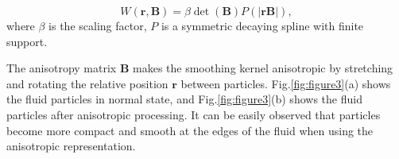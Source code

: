 \documentclass[times,twocolumn,final]{elsarticle}
\providecommand{\DIFaddtex}[1]{{\protect\color{blue}\uwave{#1}}} %
\providecommand{\DIFaddbegin}{} %
\providecommand{\DIFaddend}{} %
\providecommand{\DIFdelend}{} %
\providecommand{\DIFadd}[1]{\texorpdfstring{\DIFaddtex{#1}}{#1}} %
\begin{document}
\DIFdelend \begin{equation}
W(\mathbf{r},\mathbf{B})=\beta \operatorname{det}(\mathbf{B}) P(|\mathbf{r}\mathbf{B}|),
\label{con:equa10}
\end{equation}
where $\beta$ is the scaling factor, $P$ is a symmetric decaying spline with finite support.

The anisotropy matrix $\mathbf{B}$ makes the smoothing kernel anisotropic by stretching and rotating the relative position $\mathbf{r}$ between particles. Fig.\ref{fig:figure3}(a) shows the fluid particles in \DIFaddbegin \DIFadd{the }\DIFaddend normal state, and Fig.\ref{fig:figure3}(b) shows the fluid particles after anisotropic processing. It can be easily observed that particles become more compact and smooth at the edges of the fluid when using the anisotropic representation.
\end{document}
